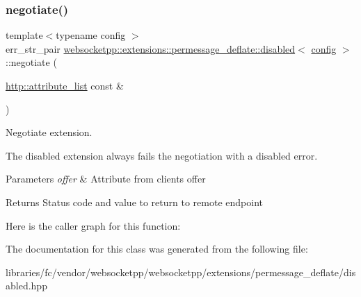 \subsubsection{\texorpdfstring{negotiate()}{negotiate()}}
{\footnotesize\ttfamily template$<$typename config $>$ \\
err\+\_\+str\+\_\+pair \mbox{\hyperlink{classwebsocketpp_1_1extensions_1_1permessage__deflate_1_1disabled}{websocketpp\+::extensions\+::permessage\+\_\+deflate\+::disabled}}$<$ \mbox{\hyperlink{classconfig}{config}} $>$\+::negotiate (\begin{DoxyParamCaption}\item[{\mbox{\hyperlink{namespacewebsocketpp_1_1http_a9744f4104772b987aa9e86c35ce1357b}{http\+::attribute\+\_\+list}} const \&}]{ }\end{DoxyParamCaption})\hspace{0.3cm}{\ttfamily [inline]}}



Negotiate extension. 

The disabled extension always fails the negotiation with a disabled error.


\begin{DoxyParams}{Parameters}
{\em offer} & Attribute from client\textquotesingle{}s offer \\
\hline
\end{DoxyParams}
\begin{DoxyReturn}{Returns}
Status code and value to return to remote endpoint 
\end{DoxyReturn}
Here is the caller graph for this function\+:


The documentation for this class was generated from the following file\+:\begin{DoxyCompactItemize}
\item 
libraries/fc/vendor/websocketpp/websocketpp/extensions/permessage\+\_\+deflate/disabled.\+hpp\end{DoxyCompactItemize}

